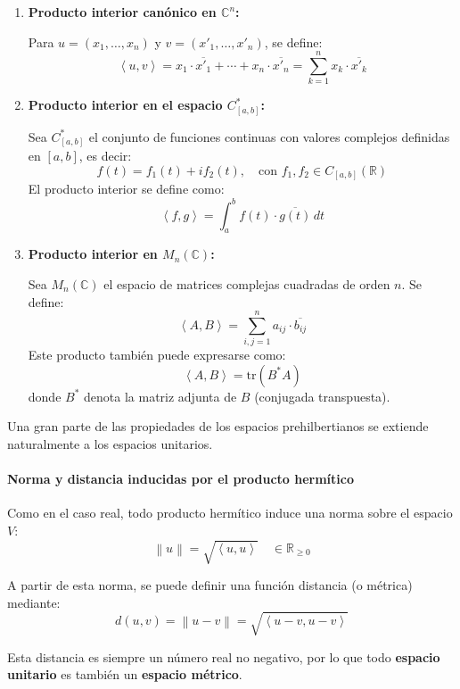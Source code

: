 \begin{enumerate}
  \item \textbf{Producto interior canónico en \(\mathbb{C}^n\):}

  Para \(u = (x_1, \dots, x_n)\) y \(v = (x'_1, \dots, x'_n)\), se define:
  \[
    \left\langle u, v \right\rangle = x_1 \cdot \overline{x'_1} + \cdots + x_n \cdot \overline{x'_n}
    = \sum_{k=1}^{n} x_k \cdot \overline{x'_k}
  \]

  \item \textbf{Producto interior en el espacio \(C^*_{[a,b]}\):}

  Sea \(C^*_{[a,b]}\) el conjunto de funciones continuas con valores complejos definidas en \([a,b]\), es decir:
  \[
    f(t) = f_1(t) + i f_2(t), \quad \text{con } f_1, f_2 \in C_{[a,b]}(\mathbb{R})
  \]
  El producto interior se define como:
  \[
    \left\langle f, g \right\rangle = \int_{a}^{b} f(t) \cdot \overline{g(t)} \, dt
  \]

  \item \textbf{Producto interior en \(M_n(\mathbb{C})\):}

  Sea \(M_n(\mathbb{C})\) el espacio de matrices complejas cuadradas de orden \(n\). Se define:
  \[
    \left\langle A, B \right\rangle = \sum_{i,j=1}^{n} a_{ij} \cdot \overline{b_{ij}} 
  \]
  Este producto también puede expresarse como:
  \[
    \left\langle A, B \right\rangle = \mathrm{tr}(B^* A)
  \]
  donde \(B^*\) denota la matriz adjunta de \(B\) (conjugada transpuesta).
\end{enumerate}

Una gran parte de las propiedades de los espacios prehilbertianos se extiende naturalmente a los espacios unitarios.

\paragraph{Norma y distancia inducidas por el producto hermítico}

Como en el caso real, todo producto hermítico induce una norma sobre el espacio \(V\):
\[
  \left\lVert u \right\rVert = \sqrt{ \left\langle u, u \right\rangle } \quad \in \mathbb{R}_{\geq 0}
\]

A partir de esta norma, se puede definir una función distancia (o métrica) mediante:
\[
  d(u, v) = \left\lVert u - v \right\rVert = \sqrt{ \left\langle u - v, u - v \right\rangle }
\]

Esta distancia es siempre un número real no negativo, por lo que todo \textbf{espacio unitario} es también un \textbf{espacio métrico}.

